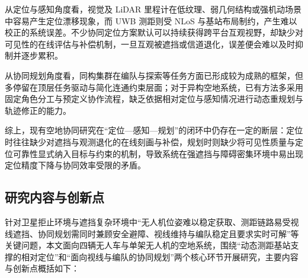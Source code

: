 从定位与感知角度看，视觉及 LiDAR 里程计在低纹理、弱几何结构或强机动场景中容易产生定位漂移现象，而 UWB 测距则受 NLoS 与基站布局制约，产生难以校正的系统误差。不少协同定位方案默认可以持续获得跨平台互观视野，却缺少对可见性的在线评估与补偿机制，一旦互观被遮挡或信道退化，误差便会难以及时抑制并逐步累积。

从协同规划角度看，同构集群在编队与探索等任务方面已形成较为成熟的框架，但多停留在顶层任务驱动与简化连通约束层面；对于异构空地系统，已有方法多采用固定角色分工与预定义协作流程，缺乏依据相对定位与感知情况进行动态重规划与轨迹修正的能力。

综上，现有空地协同研究在“定位—感知—规划”的闭环中仍存在一定的断层：定位时往往缺少对遮挡与观测退化的在线刻画与补偿，规划时则缺少将可见性质量与定位可靠性显式纳入目标与约束的机制，导致系统在强遮挡与障碍密集环境中易出现定位精度下降与协同效率受限的矛盾。

\subsection{研究内容与创新点}

针对卫星拒止环境与遮挡复杂环境中“无人机位姿难以稳定获取、测距链路易受视线遮挡、协同规划需同时兼顾安全避障、视线维持与编队稳定且要求实时可解”等关键问题，本文面向四辆无人车与单架无人机的空地系统，围绕“动态测距基站支撑的相对定位”和“面向视线与编队的协同规划”两个核心环节开展研究，主要内容与创新点概括如下：

